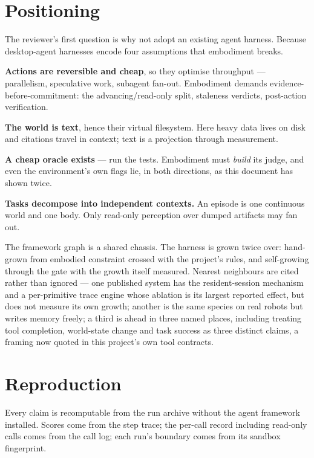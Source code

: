 \documentclass[11pt,a4paper]{report}
\newcommand{\keyrule}[1]{\textbf{\textcolor{acc}{#1}}}
\begin{document}
\chapter{Positioning}

The reviewer's first question is why not adopt an existing agent harness. Because
desktop-agent harnesses encode four assumptions that embodiment breaks.

\keyrule{Actions are reversible and cheap}, so they optimise throughput ---
parallelism, speculative work, subagent fan-out. Embodiment demands
evidence-before-commitment: the advancing/read-only split, staleness verdicts,
post-action verification.

\keyrule{The world is text}, hence their virtual filesystem. Here heavy data lives
on disk and citations travel in context; text is a projection through
measurement.

\keyrule{A cheap oracle exists} --- run the tests. Embodiment must \emph{build} its
judge, and even the environment's own flags lie, in both directions, as this
document has shown twice.

\keyrule{Tasks decompose into independent contexts.} An episode is one continuous
world and one body. Only read-only perception over dumped artifacts may fan out.

The framework graph is a shared chassis. The harness is grown twice over:
hand-grown from embodied constraint crossed with the project's rules, and
self-growing through the gate with the growth itself measured. Nearest
neighbours are cited rather than ignored --- one published system has the
resident-session mechanism and a per-primitive trace engine whose ablation is
its largest reported effect, but does not measure its own growth; another is the
same species on real robots but writes memory freely; a third is ahead in three
named places, including treating tool completion, world-state change and task
success as three distinct claims, a framing now quoted in this project's own
tool contracts.

\chapter{Reproduction}

Every claim is recomputable from the run archive without the agent framework
installed. Scores come from the step trace; the per-call record including
read-only calls comes from the call log; each run's boundary comes from its
sandbox fingerprint.
\end{document}
